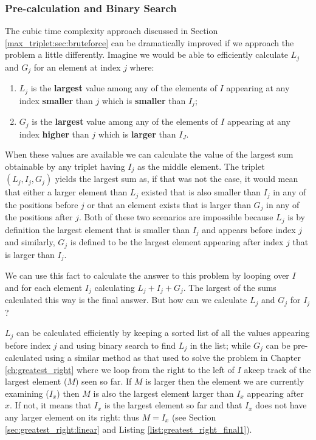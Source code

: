 


\subsubsection{Pre-calculation and Binary Search}
The cubic time complexity approach discussed in Section \ref{max_triplet:sec:bruteforce} can be
dramatically improved if we approach the problem a little differently. Imagine we would be able to
efficiently calculate $L_j$ and $G_j$ for an element at index $j$ where:
\begin{enumerate}
	\item $L_j$ is the \textbf{largest} value among any of the elements of $I$ appearing at any
	index \textbf{smaller} than $j$ which is \textbf{smaller} than $I_j$;
	\item $G_j$ is the \textbf{largest} value among any of the elements of $I$ appearing at any
	index \textbf{higher} than $j$ which is \textbf{larger} than $I_J$.
\end{enumerate}
When these values are available we can calculate the value of the largest sum obtainable by any
triplet having $I_j$  as the middle element. The triplet $(L_j, I_j, G_j)$ yields the largest sum
as, if that was not the case, it would mean that either a larger element than $L_j$  existed that is also smaller
than $I_j$ in any of the positions before $j$ or that  an element exists that is larger than $G_j$
in any of the positions after $j$. 
Both of these two scenarios are impossible  because $L_j$ is by
definition the largest element that is smaller than $I_j$ and appears before index $j$  and
similarly,  $G_j$ is defined to be the largest element appearing after index $j$ that is larger
than $I_j$.

We can use this fact to calculate the answer to this problem by looping over $I$ and for each
element $I_j$ calculating $L_j+ I_j+ G_j$. The largest of the sums calculated this way is the final
answer. But how can we calculate $L_j$ and $G_j$ for $I_j$?

$L_j$ can be calculated efficiently by keeping a sorted list of all the values appearing before
index $j$ and using binary search to find $L_j$ in the list; while $G_j$ can be pre-calculated using a
similar method as that used to solve the problem in Chapter \ref{ch:greatest_right} where we loop
from the right to the left of $I$ akeep track of the largest element ($M$) seen so far. If $M$ is larger
then the element we are currently examining ($I_x$) then $M$ is also the largest element larger than $I_x$ appearing after $x$.
If not, it means that $I_x$ is the largest element so far and that $I_x$ does not have any larger element on its right: thus $M = I_x$ (see Section \ref{sec:greatest_right:linear} and Listing \ref{list:greatest_right_final1}).
